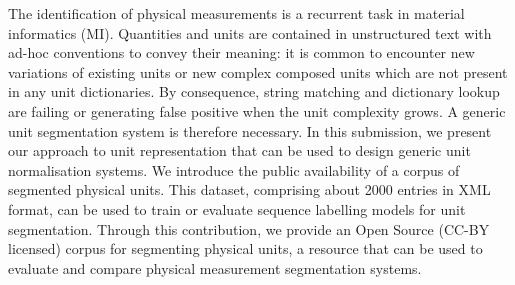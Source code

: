 The identification of physical measurements is a recurrent task in material informatics (MI).
Quantities and units are contained in unstructured text with ad-hoc conventions to convey their meaning: it is common to encounter new variations of existing units or new complex composed units which are not present in any unit dictionaries. By consequence, string matching and dictionary lookup are failing or generating false positive when the unit complexity grows. A generic unit segmentation system is therefore necessary.
In this submission, we present our approach to unit representation that can be used to design generic unit normalisation systems. We introduce the public availability of a corpus of segmented physical units.
This dataset, comprising about 2000 entries in XML format, can be used to train or evaluate sequence labelling models for unit segmentation. Through this contribution, we provide an Open Source (CC-BY licensed) corpus for segmenting physical units, a resource that can be used to evaluate and compare physical measurement segmentation systems. 